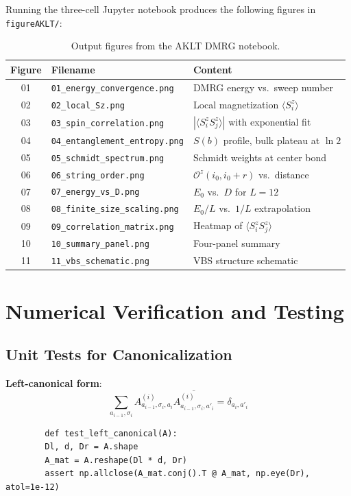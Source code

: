 \documentclass[aps,prb,onecolumn,scriptaddress]{revtex4-2}
\begin{document}
	Running the three-cell Jupyter notebook produces the following figures
	in \texttt{figureAKLT/}:
	
	\begin{table}[h]
		\centering
		\begin{tabular}{clp{8cm}}
			\toprule
			Figure & Filename & Content \\
			\midrule
			01 & \texttt{01\_energy\_convergence.png} & DMRG energy vs.\ sweep number \\
			02 & \texttt{02\_local\_Sz.png} & Local magnetization $\langle S^z_i\rangle$ \\
			03 & \texttt{03\_spin\_correlation.png} & $|\langle S^z_i S^z_j\rangle|$ with exponential fit \\
			04 & \texttt{04\_entanglement\_entropy.png} & $S(b)$ profile, bulk plateau at $\ln 2$ \\
			05 & \texttt{05\_schmidt\_spectrum.png} & Schmidt weights at center bond \\
			06 & \texttt{06\_string\_order.png} & $\mathcal{O}^z(i_0, i_0+r)$ vs.\ distance \\
			07 & \texttt{07\_energy\_vs\_D.png} & $E_0$ vs.\ $D$ for $L=12$ \\
			08 & \texttt{08\_finite\_size\_scaling.png} & $E_0/L$ vs.\ $1/L$ extrapolation \\
			09 & \texttt{09\_correlation\_matrix.png} & Heatmap of $\langle S^z_i S^z_j\rangle$ \\
			10 & \texttt{10\_summary\_panel.png} & Four-panel summary \\
			11 & \texttt{11\_vbs\_schematic.png} & VBS structure schematic \\
			\bottomrule
		\end{tabular}
		\caption{Output figures from the AKLT DMRG notebook.}
	\end{table}
	
	\clearpage
	\section{Numerical Verification and Testing}
	
	\subsection{Unit Tests for Canonicalization}
	
	\textbf{Left-canonical form}:
	\begin{equation}
		\sum_{a_{i-1}, \sigma_i} A^{(i)}_{a_{i-1}, \sigma_i, a_i}
		\overline{A^{(i)}_{a_{i-1}, \sigma_i, a'_i}} = \delta_{a_i, a'_i}
	\end{equation}
	\begin{verbatim}
		def test_left_canonical(A):
		Dl, d, Dr = A.shape
		A_mat = A.reshape(Dl * d, Dr)
		assert np.allclose(A_mat.conj().T @ A_mat, np.eye(Dr), atol=1e-12)
	\end{verbatim}
	
\end{document}
